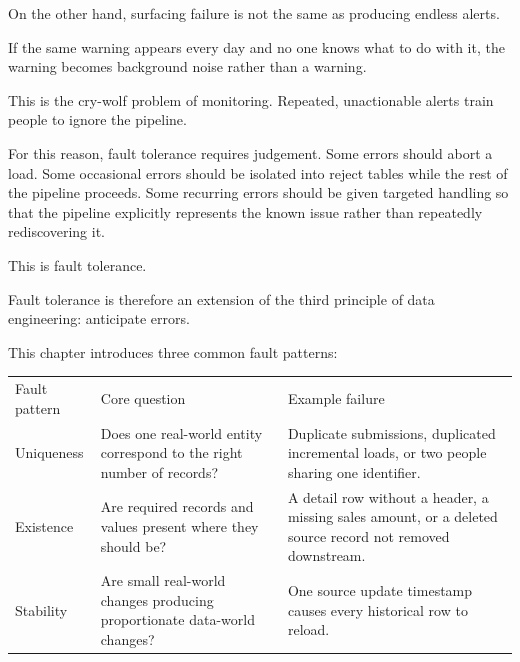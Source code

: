 \documentclass[10pt,openany,10pt]{book}
\newcounter{none}
\let\podeToprule\toprule
\let\podeMidrule\midrule
\let\podeBottomrule\bottomrule
\renewcommand{\toprule}{\arrayrulecolor{pbiGrid}\podeToprule}
\renewcommand{\midrule}{\arrayrulecolor{pbiGrid}\podeMidrule}
\renewcommand{\bottomrule}{\arrayrulecolor{pbiGrid}\podeBottomrule}
\begin{document}
On the other hand, surfacing failure is not the same as producing
endless alerts.

If the same warning appears every day and no one knows what to do with
it, the warning becomes background noise rather than a warning.

This is the cry-wolf problem of monitoring. Repeated, unactionable
alerts train people to ignore the pipeline.

For this reason, fault tolerance requires judgement. Some errors should
abort a load. Some occasional errors should be isolated into reject
tables while the rest of the pipeline proceeds. Some recurring errors
should be given targeted handling so that the pipeline explicitly
represents the known issue rather than repeatedly rediscovering it.

This is fault tolerance.

Fault tolerance is therefore an extension of the third principle of data
engineering: anticipate errors.

This chapter introduces three common fault patterns:

{\def\LTcaptype{none} %
\begin{longtable}[]{@{}
  >{\raggedright\arraybackslash}p{}
  >{\raggedright\arraybackslash}p{}
  >{\raggedright\arraybackslash}p{}@{}}
\toprule\noalign{}
\begin{minipage}[b]{\linewidth}\raggedright
Fault pattern
\end{minipage} & \begin{minipage}[b]{\linewidth}\raggedright
Core question
\end{minipage} & \begin{minipage}[b]{\linewidth}\raggedright
Example failure
\end{minipage} \\
\midrule\noalign{}
\endhead
\bottomrule\noalign{}
\endlastfoot
Uniqueness & Does one real-world entity correspond to the right number
of records? & Duplicate submissions, duplicated incremental loads, or
two people sharing one identifier. \\
Existence & Are required records and values present where they should
be? & A detail row without a header, a missing sales amount, or a
deleted source record not removed downstream. \\
Stability & Are small real-world changes producing proportionate
data-world changes? & One source update timestamp causes every
historical row to reload. \\
\end{longtable}
}
\end{document}
